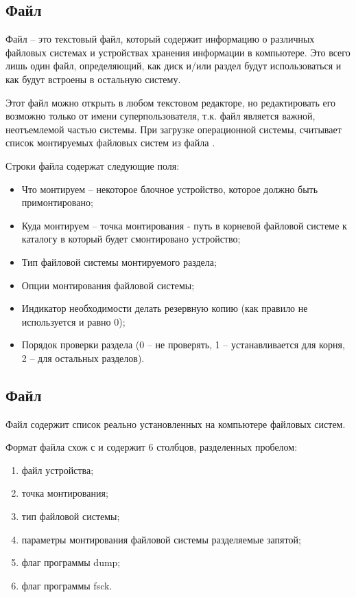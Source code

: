 \subsection{Файл }

Файл  -- это текстовый файл, который содержит информацию о различных файловых системах и устройствах хранения информации в компьютере. Это всего лишь один файл, определяющий, как диск и/или раздел будут использоваться и как будут встроены в остальную систему. 

Этот файл можно открыть в любом текстовом редакторе, но редактировать его возможно только от имени суперпользователя, т.к. файл является важной, неотъемлемой частью системы. При загрузке операционной системы,  считывает список монтируемых файловых систем из файла .



Строки файла содержат следующие поля:
\begin{itemize}
	\item Что монтируем -- некоторое блочное устройство, которое должно быть примонтировано;
	\item Куда монтируем -- точка монтирования - путь в корневой файловой системе к каталогу в который будет смонтировано устройство;
	\item Тип файловой системы монтируемого раздела;
	\item Опции монтирования файловой системы;
	\item Индикатор необходимости делать резервную копию (как правило не используется и равно 0);
	\item Порядок проверки раздела (0 -- не проверять, 1 -- устанавливается для корня, 2 -- для остальных разделов).
\end{itemize}

\subsection{Файл }

Файл  содержит список реально установленных на компьютере файловых систем.


Формат файла схож с  и содержит 6 столбцов, разделенных пробелом:
\begin{enumerate}
	\item файл устройства;
	\item точка монтирования;
	\item тип файловой системы;
	\item параметры монтирования файловой системы разделяемые запятой;
	\item флаг программы dump;
	\item флаг программы fsck.
\end{enumerate}

